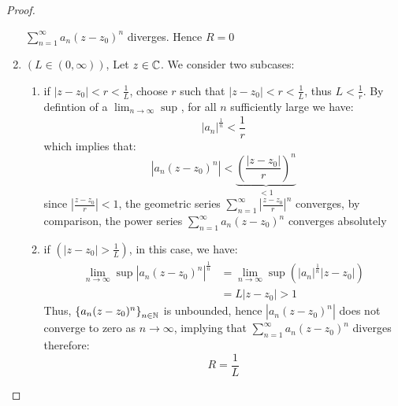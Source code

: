 \begin{proof}
\begin{enumerate}
   $\sum_{n=1}^{\infty} a_n (z-z_0) ^n  $ diverges. Hence $R = 0 $ 
   \item $(L \in  (0, \infty ) )  $, Let $z \in  \mathbb{C}  $. We consider two subcases:
     \begin{enumerate}[i]
     \item if $ \left| z-z_0 \right| < r < \frac{1}{L}$, choose $r $ such that 
       $\left| z-z_0 \right|<  r < \frac{1}{L} $, thus $L < \frac{1}{r} $. By defintion of a $\lim_{n \to \infty} \sup_{}  $,
       for all $n $ sufficiently large we have: 
       \[
       \left| a_n  \right|^{\frac{1}{n}} <  \frac{1}{r}
       \]
       which implies that: 
       \[
       \left| a_n (z-z_0) ^n  \right| <  
       \underbrace{
         \left( 
           \frac{\left| z-z_0 \right|}{r}
         \right)^n 
       }_{<  1} 
       \]
       since $\left| \frac{z-z_0}{r} \right| <  1$, the geometric series $\sum_{n=1}^{\infty} \left| \frac{z-z_0}{r} \right|^n $ converges, by comparison, the power series $\sum_{n=1}^{\infty} a_n (z-z_0) ^n  $ converges absolutely
      \item 
        if $(\left| z-z_0 \right| > \frac{1}{L})  $, in this case, we have:
        \begin{align*}
        \lim_{n \to \infty} \sup_{} 
        \left| a_n (z-z_0) ^n  \right|^{\frac{1}{n}} & = 
        \lim_{n \to \infty} \sup_{} 
        \left( 
          \left| a_n  \right|^{\frac{1}{n}} \left| z-z_0 \right| 
        \right) \\
        &=
        L \left| z-z_0 \right| > 1
        \end{align*}
        Thus, $\left\{ a_n (z-z_0) ^n  \right\}_{n \in  \mathbb{N}} $  is unbounded, hence 
        $\left| a_n (z-z_0) ^n  \right| $  does not converge to zero as $n \rightarrow \infty  $, 
        implying that $\sum_{n=1}^{\infty} a_n (z-z_0) ^n  $  diverges therefore:
        \[
        R = \frac{1}{L}
        \]
        
     \end{enumerate}
  \end{enumerate}
\end{proof}
